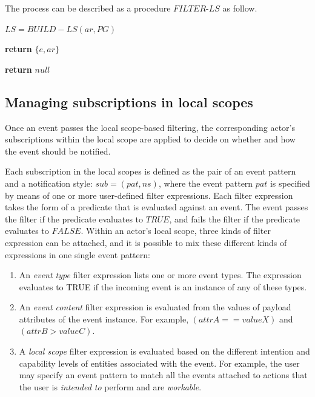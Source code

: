 The process can be described as a procedure $FILTER\textrm{-}LS$ as follow.

{\footnotesize
\begin{algorithm}
\begin{algorithmic}[1]
	\State $LS = BUILD-LS(ar, PG)$

   						\State \textbf{return} $\{e, ar\}$ 
   					\EndIf
				\EndFor

   			\EndIf
   		\EndFor
	\EndFor
	\State \textbf{return} $null$ 
\EndProcedure
\end{algorithmic}
\end{algorithm}
}
\subsection{Managing subscriptions in local scopes} %
\label{sub:managing_subscriptions}
Once an event passes the local scope-based filtering, the corresponding actor's subscriptions within the local scope are applied to decide on whether and how the event should be notified. 

Each subscription in the local scopes is defined as the pair of an event pattern and a notification style: $sub=(pat, ns)$, where the event pattern $pat$ is specified by means of one or more user-defined filter expressions. Each filter expression takes the form of a predicate that is evaluated against an event. The event passes the filter if the predicate evaluates to $TRUE$, and fails the filter if the predicate evaluates to $FALSE$. Within an actor's local scope, three kinds of filter expression can be attached, and it is possible to mix these different kinds of expressions in one single event pattern:

\begin{enumerate}
	\item An \emph{event type} filter expression lists one or more event types. The expression evaluates to TRUE if the incoming event is an instance of any of these types.
	\item An \emph{event content} filter expression is evaluated from the values of payload attributes of the event instance. For example, $(attrA == valueX)$ and $(attrB > valueC)$.
	\item A \emph{local scope} filter expression is evaluated based on the different intention and capability levels of entities associated with the event. For example, the user may specify an event pattern to match all the events attached to actions that the user is \emph{intended to} perform and are \emph{workable}.
\end{enumerate}

